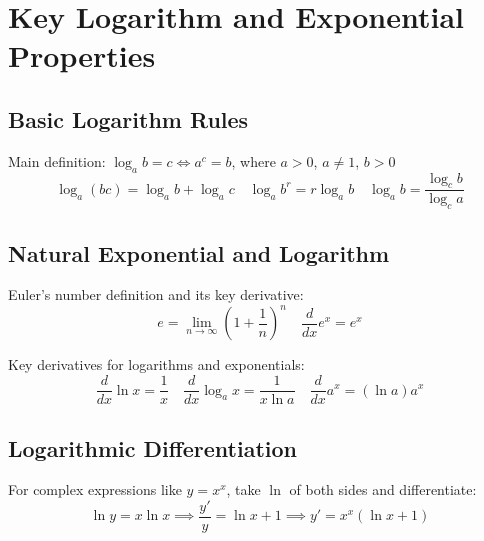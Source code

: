\documentclass{article}
\begin{document}
\section*{Key Logarithm and Exponential Properties}

\subsection*{Basic Logarithm Rules}
Main definition: \(\log_a b = c \iff a^c = b\), where \(a>0\), \(a\ne1\), \(b>0\)
\[ \log_a(bc) = \log_a b + \log_a c \quad \log_a b^r = r\log_a b \quad \log_a b = \frac{\log_c b}{\log_c a} \]

\subsection*{Natural Exponential and Logarithm}
Euler's number definition and its key derivative:
\[ e = \lim_{n\to\infty}\left(1+\frac{1}{n}\right)^n \quad \frac{d}{dx}e^x = e^x \]

Key derivatives for logarithms and exponentials:
\[ \frac{d}{dx}\ln x = \frac{1}{x} \quad \frac{d}{dx}\log_a x = \frac{1}{x\ln a} \quad \frac{d}{dx}a^x = (\ln a)a^x \]

\subsection*{Logarithmic Differentiation}
For complex expressions like \(y=x^x\), take \(\ln\) of both sides and differentiate:
\[ \ln y = x\ln x \implies \frac{y'}{y} = \ln x + 1 \implies y' = x^x(\ln x + 1) \]
\end{document}
